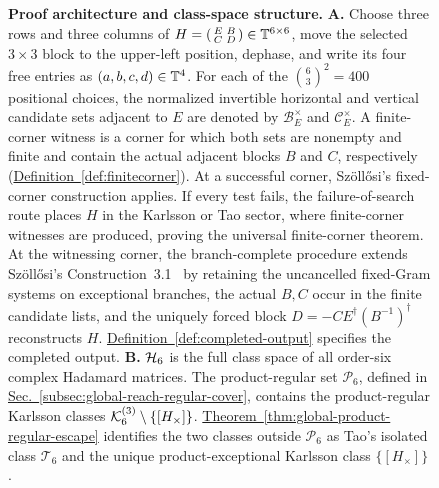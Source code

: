 \begin{figure}[htb!]
\caption{\textbf{Proof architecture and class-space structure.} \textbf{A.} Choose three rows and three columns of $H=\left(\begin{smallmatrix}E&B\\ C&D\end{smallmatrix}\right)\in\mathbb T^{6\times6}$, move the selected $3\times3$ block to the upper-left position, dephase, and write its four free entries as $(a,b,c,d)\in\mathbb T^4$. For each of the $\binom{6}{3}^{2}=400$ positional choices, the normalized invertible horizontal and vertical candidate sets adjacent to $E$ are denoted by $\mathcal B_E^{\times}$ and $\mathcal C_E^{\times}$. A finite-corner witness is a corner for which both sets are nonempty and finite and contain the actual adjacent blocks $B$ and $C$, respectively (\hyperref[def:finitecorner]{Definition~\ref*{def:finitecorner}}). At a successful corner, Sz\"oll\H{o}si's fixed-corner construction applies. If every test fails, the failure-of-search route places $H$ in the Karlsson or Tao sector, where finite-corner witnesses are produced, proving the universal finite-corner theorem. At the witnessing corner, the branch-complete procedure extends Sz\"oll\H{o}si's Construction~3.1~\cite{Szollosi2012FourParameter} by retaining the uncancelled fixed-Gram systems on exceptional branches, the actual $B,C$ occur in the finite candidate lists, and the uniquely forced block $D=-CE^\dagger(B^{-1})^\dagger$ reconstructs $H$. \hyperref[def:completed-output]{Definition~\ref*{def:completed-output}} specifies the completed output. \textbf{B.} $\mathcal H_6$ is the full class space of all order-six complex Hadamard matrices. The product-regular set $\mathcal P_6$, defined in \hyperref[subsec:global-reach-regular-cover]{Sec.~\ref*{subsec:global-reach-regular-cover}}, contains the product-regular Karlsson classes $\mathcal K_6^{(3)}\setminus\{[H_\times]\}$. \hyperref[thm:global-product-regular-escape]{Theorem~\ref*{thm:global-product-regular-escape}} identifies the two classes outside $\mathcal P_6$ as Tao's isolated class $\mathcal T_6$ and the unique product-exceptional Karlsson class $\{[H_\times]\}$.}
\label{fig:finite-corner-proof}
\endgroup
\end{figure}
